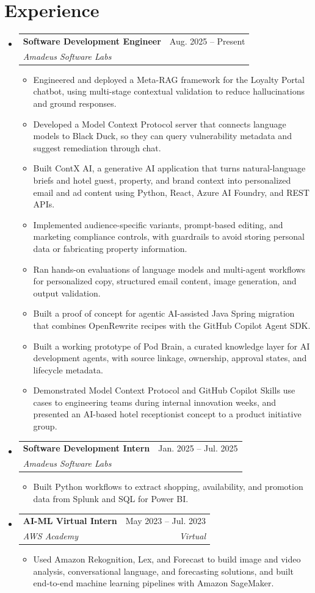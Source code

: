 \documentclass[a4paper,11pt]{article}
\makeatletter
\newcommand{\entry}[4]{\item\begin{tabularx}{\textwidth}{@{}Xr@{}}\textbf{#1}& #2\\\textit{\small #3}&\textit{\small #4}\end{tabularx}\vspace{-5pt}}
\newcommand{\bulletpoint}[1]{\item\small{#1}}
\makeatother
\begin{document}
\section{Experience}
\begin{itemize}[leftmargin=0in,label={}]
  \entry{Software Development Engineer}{Aug. 2025 -- Present}{Amadeus Software Labs}{}
  \begin{itemize}
    \bulletpoint{Engineered and deployed a Meta-RAG framework for the Loyalty Portal chatbot, using multi-stage contextual validation to reduce hallucinations and ground responses.}
    \bulletpoint{Developed a Model Context Protocol server that connects language models to Black Duck, so they can query vulnerability metadata and suggest remediation through chat.}
    \bulletpoint{Built ContX AI, a generative AI application that turns natural-language briefs and hotel guest, property, and brand context into personalized email and ad content using Python, React, Azure AI Foundry, and REST APIs.}
    \bulletpoint{Implemented audience-specif{}ic variants, prompt-based editing, and marketing compliance controls, with guardrails to avoid storing personal data or fabricating property information.}
    \bulletpoint{Ran hands-on evaluations of language models and multi-agent workf{}lows for personalized copy, structured email content, image generation, and output validation.}
    \bulletpoint{Built a proof of concept for agentic AI-assisted Java Spring migration that combines OpenRewrite recipes with the GitHub Copilot Agent SDK.}
    \bulletpoint{Built a working prototype of Pod Brain, a curated knowledge layer for AI development agents, with source linkage, ownership, approval states, and lifecycle metadata.}
    \bulletpoint{Demonstrated Model Context Protocol and GitHub Copilot Skills use cases to engineering teams during internal innovation weeks, and presented an AI-based hotel receptionist concept to a product initiative group.}
  \end{itemize}
  \entry{Software Development Intern}{Jan. 2025 -- Jul. 2025}{Amadeus Software Labs}{}
  \begin{itemize}
    \bulletpoint{Built Python workf{}lows to extract shopping, availability, and promotion data from Splunk and SQL for Power BI.}
  \end{itemize}
  \entry{AI-ML Virtual Intern}{May 2023 -- Jul. 2023}{AWS Academy}{Virtual}
  \begin{itemize}
    \bulletpoint{Used Amazon Rekognition, Lex, and Forecast to build image and video analysis, conversational language, and forecasting solutions, and built end-to-end machine learning pipelines with Amazon SageMaker.}
  \end{itemize}
\end{itemize}
\end{document}
